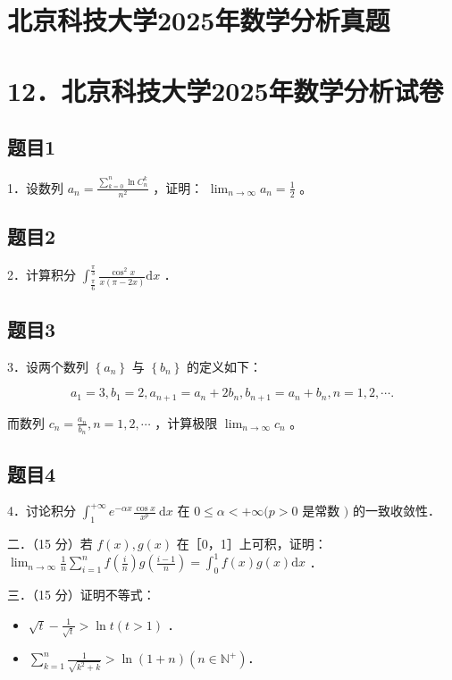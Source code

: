 \documentclass{article}
\begin{document}
\section*{北京科技大学2025年数学分析真题}
\section*{12．北京科技大学2025年数学分析试卷}

\subsection{题目1}
1．设数列 \(a_{n}=\frac{\sum_{k=0}^{n} \ln C_{n}^{k}}{n^{2}}\) ，证明： \(\lim _{n \rightarrow \infty} a_{n}=\frac{1}{2}\) 。

\subsection{题目2}
2．计算积分 \(\int_{\frac{\pi}{6}}^{\frac{\pi}{3}} \frac{\cos ^{2} x}{x(\pi-2 x)} \mathrm{d} x\) ．

\subsection{题目3}
3．设两个数列 \(\left\{a_{n}\right\}\) 与 \(\left\{b_{n}\right\}\) 的定义如下：

\[
a_{1}=3, b_{1}=2, a_{n+1}=a_{n}+2 b_{n}, b_{n+1}=a_{n}+b_{n}, n=1,2, \cdots .
\]

而数列 \(c_{n}=\frac{a_{n}}{b_{n}}, n=1,2, \cdots\) ，计算极限 \(\lim _{n \rightarrow \infty} c_{n}\) 。

\subsection{题目4}
4．讨论积分 \(\int_{1}^{+\infty} e^{-\alpha x} \frac{\cos x}{x^{p}} \mathrm{~d} x\) 在 \(0 \leq \alpha<+\infty(p>0\) 是常数 \()\) 的一致收敛性．

二．（15 分）若 \(f(x), g(x)\) 在［0，1］上可积，证明： \(\lim _{n \rightarrow \infty} \frac{1}{n} \sum_{i=1}^{n} f\left(\frac{i}{n}\right) g\left(\frac{i-1}{n}\right)=\int_{0}^{1} f(x) g(x) \mathrm{d} x\) ．

三．（15 分）证明不等式：

\begin{itemize}
  \item[（1）] \(\sqrt{t}-\frac{1}{\sqrt{t}}>\ln t(t>1)\) ．
  \item[（2）] \(\sum_{k=1}^{n} \frac{1}{\sqrt{k^{2}+k}}>\ln (1+n)\left(n \in \mathbb{N}^{+}\right)\)．
\end{itemize}
\end{document}

